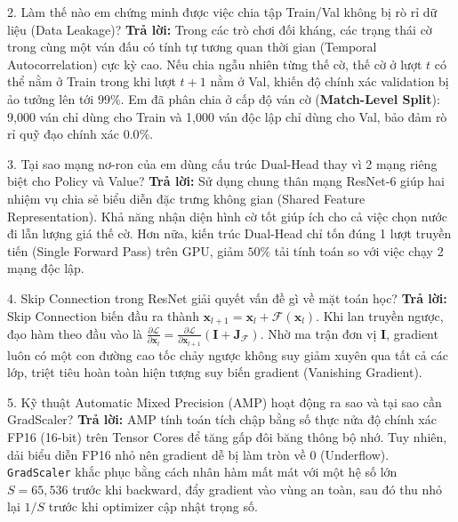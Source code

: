 \documentclass[12pt,a4paper,oneside]{report}
\begin{document}
\begin{defensebox}{2. Làm thế nào em chứng minh được việc chia tập Train/Val không bị rò rỉ dữ liệu (Data Leakage)?}
\textbf{Trả lời:} Trong các trò chơi đối kháng, các trạng thái cờ trong cùng một ván đấu có tính tự tương quan thời gian (Temporal Autocorrelation) cực kỳ cao. Nếu chia ngẫu nhiên từng thế cờ, thế cờ ở lượt $t$ có thể nằm ở Train trong khi lượt $t+1$ nằm ở Val, khiến độ chính xác validation bị ảo tưởng lên tới $99\%$. Em đã phân chia ở cấp độ ván cờ (\textbf{Match-Level Split}): 9,000 ván chỉ dùng cho Train và 1,000 ván độc lập chỉ dùng cho Val, bảo đảm rò rỉ quỹ đạo chính xác $0.0\%$.
\end{defensebox}

\begin{defensebox}{3. Tại sao mạng nơ-ron của em dùng cấu trúc Dual-Head thay vì 2 mạng riêng biệt cho Policy và Value?}
\textbf{Trả lời:} Sử dụng chung thân mạng ResNet-6 giúp hai nhiệm vụ chia sẻ biểu diễn đặc trưng không gian (Shared Feature Representation). Khả năng nhận diện hình cờ tốt giúp ích cho cả việc chọn nước đi lẫn lượng giá thế cờ. Hơn nữa, kiến trúc Dual-Head chỉ tốn đúng 1 lượt truyền tiến (Single Forward Pass) trên GPU, giảm $50\%$ tải tính toán so với việc chạy 2 mạng độc lập.
\end{defensebox}

\begin{defensebox}{4. Skip Connection trong ResNet giải quyết vấn đề gì về mặt toán học?}
\textbf{Trả lời:} Skip Connection biến đầu ra thành $\mathbf{x}_{l+1} = \mathbf{x}_l + \mathcal{F}(\mathbf{x}_l)$. Khi lan truyền ngược, đạo hàm theo đầu vào là $\frac{\partial \mathcal{L}}{\partial \mathbf{x}_l} = \frac{\partial \mathcal{L}}{\partial \mathbf{x}_{l+1}} (\mathbf{I} + \mathbf{J}_{\mathcal{F}})$. Nhờ ma trận đơn vị $\mathbf{I}$, gradient luôn có một con đường cao tốc chảy ngược không suy giảm xuyên qua tất cả các lớp, triệt tiêu hoàn toàn hiện tượng suy biến gradient (Vanishing Gradient).
\end{defensebox}

\begin{defensebox}{5. Kỹ thuật Automatic Mixed Precision (AMP) hoạt động ra sao và tại sao cần GradScaler?}
\textbf{Trả lời:} AMP tính toán tích chập bằng số thực nửa độ chính xác FP16 (16-bit) trên Tensor Cores để tăng gấp đôi băng thông bộ nhớ. Tuy nhiên, dải biểu diễn FP16 nhỏ nên gradient dễ bị làm tròn về $0$ (Underflow). \texttt{GradScaler} khắc phục bằng cách nhân hàm mất mát với một hệ số lớn $S = 65,536$ trước khi backward, đẩy gradient vào vùng an toàn, sau đó thu nhỏ lại $1/S$ trước khi optimizer cập nhật trọng số.
\end{defensebox}
\end{document}
